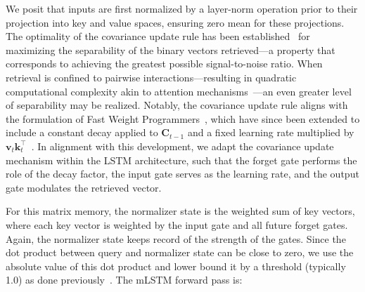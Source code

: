 We posit that inputs are first normalized by a layer-norm operation prior to their projection into key and value spaces, ensuring zero mean for these projections. The optimality of the covariance update rule has been established~\citep{Dayan:91} for maximizing the separability of the binary vectors retrieved—a property that corresponds to achieving the greatest possible signal-to-noise ratio. When retrieval is confined to pairwise interactions—resulting in quadratic computational complexity akin to attention mechanisms~\citep{Krotov:16,Krotov:17,Ramsauer:21}—an even greater level of separability may be realized. Notably, the covariance update rule aligns with the formulation of Fast Weight Programmers~\citep{Schmidhuber:92ncfastweights,Schlag:21}, which have since been extended to include a constant decay applied to $\mathbf{C}_{t-1}$ and a fixed learning rate multiplied by 
$\mathbf{v}_{t} \mathbf{k}_t ^\top$~\citep{Ba:16}.
In alignment with this development, we adapt the covariance update mechanism within the LSTM architecture, such that the forget gate performs the role of the decay factor, the input gate serves as the learning rate, and the output gate modulates the retrieved vector.

For this matrix memory, the normalizer state is the weighted sum of key vectors, where each key vector is weighted by the input gate and all future forget gates. Again, the normalizer state keeps record of the strength of the gates. Since the dot product between query and normalizer state can be close to zero, we use the absolute value of this dot product and lower bound it by a threshold (typically 1.0) as done previously~\citep{Sun:23arxiv}. The mLSTM forward pass is:

